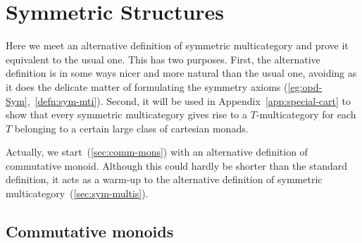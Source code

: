 


\chapter{Symmetric Structures}



\noindent
Here we meet an alternative definition of symmetric multicategory and
prove it equivalent to the usual one.  This has two purposes.  First,
the alternative definition is in some ways nicer and more natural than the
usual one, avoiding as it does the delicate matter of formulating the
symmetry axioms (\ref{eg:opd-Sym},~\ref{defn:sym-mti}).  Second, it will be
used in Appendix~\ref{app:special-cart} to show that every symmetric
multicategory gives rise to a $T$-multicategory for each $T$ belonging to a
certain large class of cartesian monads.

Actually, we start~(\ref{sec:comm-mons}) with an alternative definition of
commutative monoid.  Although this could hardly be shorter than the
standard definition, it acts as a warm-up to the alternative definition of
symmetric multicategory~(\ref{sec:sym-multis}).



\section{Commutative monoids}
%
%
%

